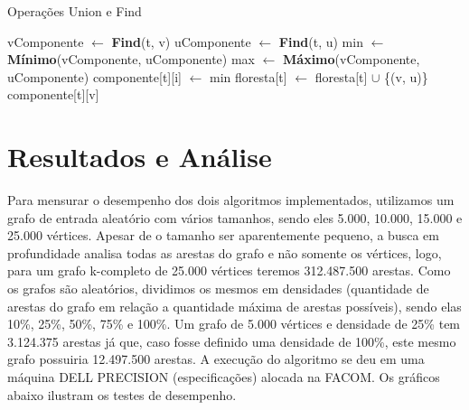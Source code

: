 \documentclass[12pt]{article}
\begin{document}
\begin{algorithm}[h]
    \DontPrintSemicolon
    \caption{Operações Union e Find}
    \label{alg_par2}
    {
        vComponente $\gets$ \textbf{Find}(t, v)\;
        uComponente $\gets$ \textbf{Find}(t, u)\;
        min $\gets$ \textbf{Mínimo}(vComponente, uComponente)\;
		max $\gets$ \textbf{Máximo}(vComponente, uComponente)\;
        {
            {
                {
                    componente[t][i] $\gets$ min\;
                }
            }
            floresta[t] $\gets$ floresta[t] $\cup$ \{(v, u)\}\;
        }
    }
    {
        \Return componente[t][v]\;
    }
\end{algorithm}

\section{Resultados e Análise}

Para mensurar o desempenho dos dois algoritmos implementados, utilizamos um grafo de entrada aleatório com vários tamanhos, sendo eles 5.000, 10.000, 15.000 e 25.000 vértices. Apesar de o tamanho ser aparentemente pequeno, a busca em profundidade analisa todas as arestas do grafo e não somente os vértices, logo, para um grafo k-completo de 25.000 vértices teremos 312.487.500 arestas. Como os grafos são aleatórios, dividimos os mesmos em densidades (quantidade de arestas do grafo em relação a quantidade máxima de arestas possíveis), sendo elas 10\%, 25\%, 50\%, 75\% e 100\%. Um grafo de 5.000 vértices e densidade de 25\% tem 3.124.375 arestas já que, caso fosse definido uma densidade de 100\%, este mesmo grafo possuiria 12.497.500 arestas.
A execução do algoritmo se deu em uma máquina DELL PRECISION (especificações) alocada na FACOM. Os gráficos abaixo ilustram os testes de desempenho.
\end{document}
